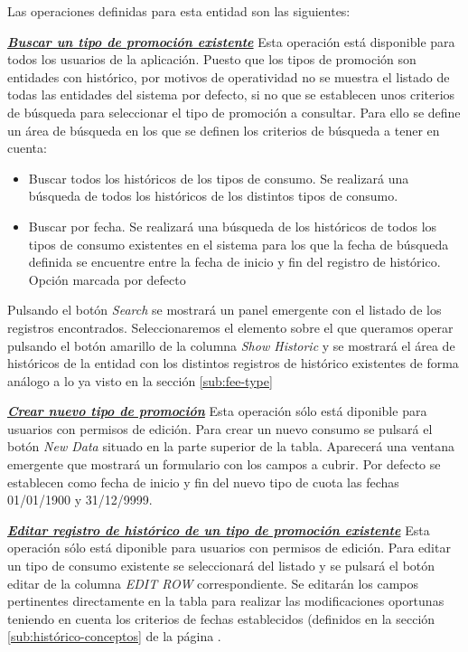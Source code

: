 Las operaciones definidas para esta entidad son las siguientes:

\underline{\textsl{\textbf{Buscar un tipo de promoción existente}}}\newline
Esta operación está disponible para todos los usuarios de la aplicación.
Puesto que los tipos de promoción son entidades con histórico, por motivos de operatividad no se muestra el listado de todas las entidades del sistema por defecto, si no que se establecen unos criterios de búsqueda para seleccionar el tipo de promoción a consultar. Para ello se define un área de búsqueda en los que se definen los criterios de búsqueda a tener en cuenta:
\begin{itemize}
\item Buscar todos los históricos de los tipos de consumo. Se realizará una búsqueda de todos los históricos de los distintos tipos de consumo.
\item Buscar por fecha. Se realizará una búsqueda de los históricos de todos los tipos de consumo existentes en el sistema para los que la fecha de búsqueda definida se encuentre entre la fecha de inicio y fin del registro de histórico. Opción marcada por defecto
\end{itemize}

Pulsando el botón \emph{Search} se mostrará un panel emergente con el listado de los registros encontrados. Seleccionaremos el elemento sobre el que queramos operar pulsando el botón amarillo de la columna \emph{Show Historic} y se mostrará el área de históricos de la entidad con los distintos registros de histórico existentes de forma análogo a lo ya visto en la sección \ref{sub:fee-type}


\underline{\textsl{\textbf{Crear nuevo tipo de promoción}}}\newline
Esta operación sólo está diponible para usuarios con permisos de edición.
Para crear un nuevo consumo se pulsará el botón \textit{New Data} situado en la parte superior de la tabla. Aparecerá una ventana emergente que mostrará un formulario con los campos a cubrir. Por defecto se establecen como fecha de inicio y fin del nuevo tipo de cuota las fechas 01/01/1900 y 31/12/9999.

\underline{\textsl{\textbf{Editar registro de histórico de un tipo de promoción existente}}}\newline
Esta operación sólo está diponible para usuarios con permisos de edición.
Para editar un tipo de consumo existente se seleccionará del listado y se pulsará el botón editar de la columna \textit{EDIT ROW} correspondiente. Se editarán los campos pertinentes directamente en la tabla para realizar las modificaciones oportunas teniendo en cuenta los criterios de fechas establecidos (definidos en la sección \ref{sub:histórico-conceptos} de la página \pageref{sub:histórico-conceptos}.


